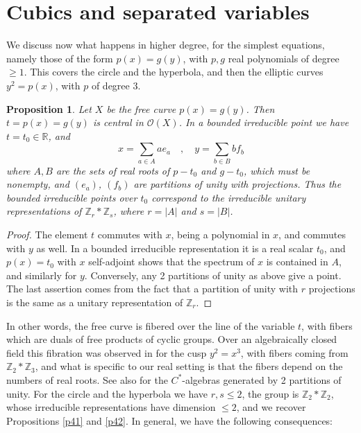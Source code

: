 \documentclass[11pt]{amsart}
\newtheorem{proposition}[theorem]{Proposition}
\theoremstyle{definition}
\begin{document}
\section{Cubics and separated variables}

We discuss now what happens in higher degree, for the simplest equations, namely those of the form $p(x)=g(y)$, with $p,g$ real polynomials of degree $\geq1$. This covers the circle and the hyperbola, and then the elliptic curves $y^2=p(x)$, with $p$ of degree 3.

\begin{proposition}\label{p61}
Let $X$ be the free curve $p(x)=g(y)$. Then $t=p(x)=g(y)$ is central in $\mathcal O(X)$. In a bounded irreducible point we have $t=t_0\in\mathbb R$, and
$$x=\sum_{a\in A}ae_a\quad,\quad y=\sum_{b\in B}bf_b$$
where $A,B$ are the sets of real roots of $p-t_0$ and $g-t_0$, which must be nonempty, and $(e_a)$, $(f_b)$ are partitions of unity with projections. Thus the bounded irreducible points over $t_0$ correspond to the irreducible unitary representations of $\mathbb Z_r*\mathbb Z_s$, where $r=|A|$ and $s=|B|$.
\end{proposition}

\begin{proof}
The element $t$ commutes with $x$, being a polynomial in $x$, and commutes with $y$ as well. In a bounded irreducible representation it is a real scalar $t_0$, and $p(x)=t_0$ with $x$ self-adjoint shows that the spectrum of $x$ is contained in $A$, and similarly for $y$. Conversely, any 2 partitions of unity as above give a point. The last assertion comes from the fact that a partition of unity with $r$ projections is the same as a unitary representation of $\mathbb Z_r$.
\end{proof}

In other words, the free curve is fibered over the line of the variable $t$, with fibers which are duals of free products of cyclic groups. Over an algebraically closed field this fibration was observed in \cite{jls} for the cusp $y^2=x^3$, with fibers coming from $\mathbb Z_2*\mathbb Z_3$, and what is specific to our real setting is that the fibers depend on the numbers of real roots. See also \cite{sch} for the $C^*$-algebras generated by 2 partitions of unity. For the circle and the hyperbola we have $r,s\leq2$, the group is $\mathbb Z_2*\mathbb Z_2$, whose irreducible representations have dimension $\leq2$, and we recover Propositions \ref{p41} and \ref{p42}. In general, we have the following consequences:
\end{document}
